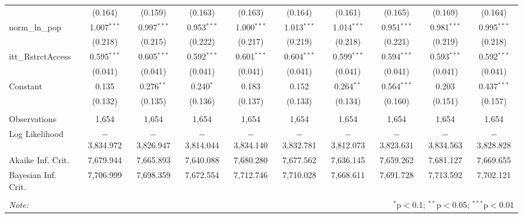 \begin{sidewaystable}[!htbp]
\begin{tabular}{@{\extracolsep{5pt}}lccccccccc}
  & (0.164) & (0.159) & (0.163) & (0.163) & (0.164) & (0.161) & (0.165) & (0.169) & (0.164) \\ 
  norm\_ln\_pop & 1.007$^{***}$ & 0.997$^{***}$ & 0.953$^{***}$ & 1.000$^{***}$ & 1.013$^{***}$ & 1.014$^{***}$ & 0.951$^{***}$ & 0.981$^{***}$ & 0.995$^{***}$ \\ 
  & (0.218) & (0.215) & (0.222) & (0.217) & (0.219) & (0.218) & (0.221) & (0.219) & (0.218) \\ 
  itt\_RstrctAccess & 0.595$^{***}$ & 0.605$^{***}$ & 0.592$^{***}$ & 0.601$^{***}$ & 0.604$^{***}$ & 0.599$^{***}$ & 0.594$^{***}$ & 0.593$^{***}$ & 0.592$^{***}$ \\ 
  & (0.041) & (0.041) & (0.041) & (0.041) & (0.041) & (0.041) & (0.041) & (0.041) & (0.041) \\ 
  Constant & 0.135 & 0.276$^{**}$ & 0.240$^{*}$ & 0.183 & 0.152 & 0.264$^{**}$ & 0.564$^{***}$ & 0.203 & 0.437$^{***}$ \\ 
  & (0.132) & (0.135) & (0.136) & (0.137) & (0.133) & (0.134) & (0.160) & (0.151) & (0.157) \\ 
 \hline \\[-1.8ex] 
Observations & 1,654 & 1,654 & 1,654 & 1,654 & 1,654 & 1,654 & 1,654 & 1,654 & 1,654 \\ 
Log Likelihood & $-$3,834.972 & $-$3,826.947 & $-$3,814.044 & $-$3,834.140 & $-$3,832.781 & $-$3,812.073 & $-$3,823.631 & $-$3,834.563 & $-$3,828.828 \\ 
Akaike Inf. Crit. & 7,679.944 & 7,665.893 & 7,640.088 & 7,680.280 & 7,677.562 & 7,636.145 & 7,659.262 & 7,681.127 & 7,669.655 \\ 
Bayesian Inf. Crit. & 7,706.999 & 7,698.359 & 7,672.554 & 7,712.746 & 7,710.028 & 7,668.611 & 7,691.728 & 7,713.592 & 7,702.121 \\ 
\hline 
\hline \\[-1.8ex] 
\textit{Note:}  & \multicolumn{9}{r}{$^{*}$p$<$0.1; $^{**}$p$<$0.05; $^{***}$p$<$0.01} \\ 
\end{tabular} 
\end{sidewaystable} 
